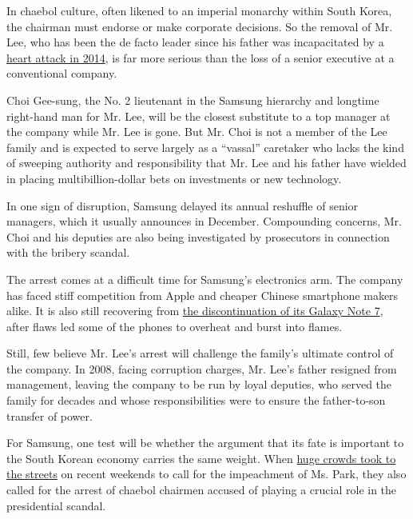 In chaebol culture, often likened to an imperial monarchy within South
Korea, the chairman must endorse or make corporate decisions. So the
removal of Mr. Lee, who has been the de facto leader since his father
was incapacitated by a
\href{https://www.nytimes3xbfgragh.onion/2014/05/12/business/international/samsungs-chairman-has-surgery-after-heart-attack.html}{heart
attack in 2014}, is far more serious than the loss of a senior executive
at a conventional company.

Choi Gee-sung, the No. 2 lieutenant in the Samsung hierarchy and
longtime right-hand man for Mr. Lee, will be the closest substitute to a
top manager at the company while Mr. Lee is gone. But Mr. Choi is not a
member of the Lee family and is expected to serve largely as a
``vassal'' caretaker who lacks the kind of sweeping authority and
responsibility that Mr. Lee and his father have wielded in placing
multibillion-dollar bets on investments or new technology.

In one sign of disruption, Samsung delayed its annual reshuffle of
senior managers, which it usually announces in December. Compounding
concerns, Mr. Choi and his deputies are also being investigated by
prosecutors in connection with the bribery scandal.

The arrest comes at a difficult time for Samsung's electronics arm. The
company has faced stiff competition from Apple and cheaper Chinese
smartphone makers alike. It is also still recovering from
\href{https://www.nytimes3xbfgragh.onion/2017/01/23/business/samsung-galaxy-note7-fires.html}{the
discontinuation of its Galaxy Note 7}, after flaws led some of the
phones to overheat and burst into flames.

Still, few believe Mr. Lee's arrest will challenge the family's ultimate
control of the company. In 2008, facing corruption charges, Mr. Lee's
father resigned from management, leaving the company to be run by loyal
deputies, who served the family for decades and whose responsibilities
were to ensure the father-to-son transfer of power.

For Samsung, one test will be whether the argument that its fate is
important to the South Korean economy carries the same weight. When
\href{https://www.nytimes3xbfgragh.onion/2016/11/26/world/asia/korea-park-geun-hye-protests.html}{huge
crowds took to the streets} on recent weekends to call for the
impeachment of Ms. Park, they also called for the arrest of chaebol
chairmen accused of playing a crucial role in the presidential scandal.

